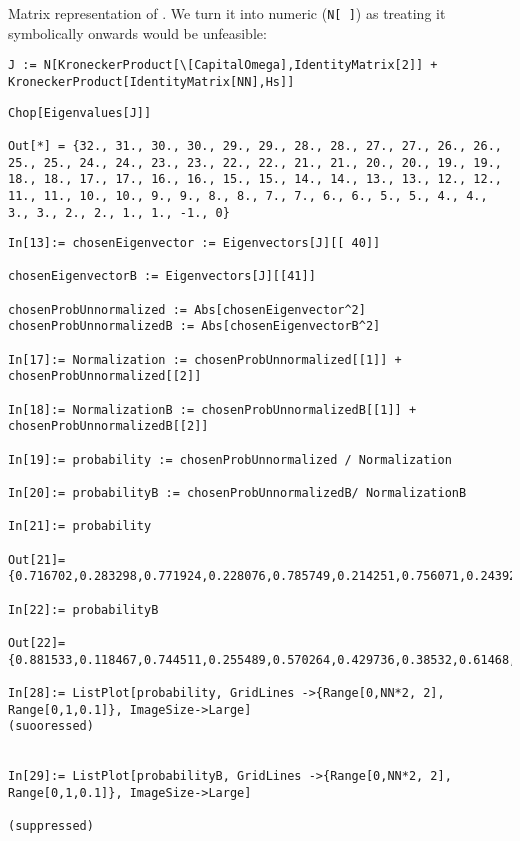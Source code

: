 Matrix representation of \cite[Eq. 1]{Lloyd:Time}.
We turn it into numeric (\verb!N[ ]!) as treating  it symbolically onwards would be unfeasible:
\begin{lstlisting}
J := N[KroneckerProduct[\[CapitalOmega],IdentityMatrix[2]] + KroneckerProduct[IdentityMatrix[NN],Hs]]
\end{lstlisting}
\begin{lstlisting}
Chop[Eigenvalues[J]]

Out[*] = {32., 31., 30., 30., 29., 29., 28., 28., 27., 27., 26., 26., 25., 25., 24., 24., 23., 23., 22., 22., 21., 21., 20., 20., 19., 19., 18., 18., 17., 17., 16., 16., 15., 15., 14., 14., 13., 13., 12., 12., 11., 11., 10., 10., 9., 9., 8., 8., 7., 7., 6., 6., 5., 5., 4., 4., 3., 3., 2., 2., 1., 1., -1., 0}
\end{lstlisting}
\begin{lstlisting}
In[13]:= chosenEigenvector := Eigenvectors[J][[ 40]]

chosenEigenvectorB := Eigenvectors[J][[41]]

chosenProbUnnormalized := Abs[chosenEigenvector^2]
chosenProbUnnormalizedB := Abs[chosenEigenvectorB^2]

In[17]:= Normalization := chosenProbUnnormalized[[1]] + chosenProbUnnormalized[[2]]

In[18]:= NormalizationB := chosenProbUnnormalizedB[[1]] + chosenProbUnnormalizedB[[2]]

In[19]:= probability := chosenProbUnnormalized / Normalization

In[20]:= probabilityB := chosenProbUnnormalizedB/ NormalizationB

In[21]:= probability

Out[21]= {0.716702,0.283298,0.771924,0.228076,0.785749,0.214251,0.756071,0.243929,0.687408,0.312592,0.590214,0.409786,0.479286,0.520714,0.371512,0.628488,0.283298,0.716702,0.228076,0.771924,0.214251,0.785749,0.243929,0.756071,0.312592,0.687408,0.409786,0.590214,0.520714,0.479286,0.628488,0.371512,0.716702,0.283298,0.771924,0.228076,0.785749,0.214251,0.756071,0.243929,0.687408,0.312592,0.590214,0.409786,0.479286,0.520714,0.371512,0.628488,0.283298,0.716702,0.228076,0.771924,0.214251,0.785749,0.243929,0.756071,0.312592,0.687408,0.409786,0.590214,0.520714,0.479286,0.628488,0.371512}

In[22]:= probabilityB

Out[22]= {0.881533,0.118467,0.744511,0.255489,0.570264,0.429736,0.38532,0.61468,0.217835,0.782165,0.0933066,0.906693,0.0306941,0.969306,0.0395291,0.960471,0.118467,0.881533,0.255489,0.744511,0.429736,0.570264,0.61468,0.38532,0.782165,0.217835,0.906693,0.0933066,0.969306,0.0306941,0.960471,0.0395291,0.881533,0.118467,0.744511,0.255489,0.570264,0.429736,0.38532,0.61468,0.217835,0.782165,0.0933066,0.906693,0.0306941,0.969306,0.0395291,0.960471,0.118467,0.881533,0.255489,0.744511,0.429736,0.570264,0.61468,0.38532,0.782165,0.217835,0.906693,0.0933066,0.969306,0.0306941,0.960471,0.0395291}

In[28]:= ListPlot[probability, GridLines ->{Range[0,NN*2, 2], Range[0,1,0.1]}, ImageSize->Large]
(suooressed)


In[29]:= ListPlot[probabilityB, GridLines ->{Range[0,NN*2, 2], Range[0,1,0.1]}, ImageSize->Large]

(suppressed)

\end{lstlisting}